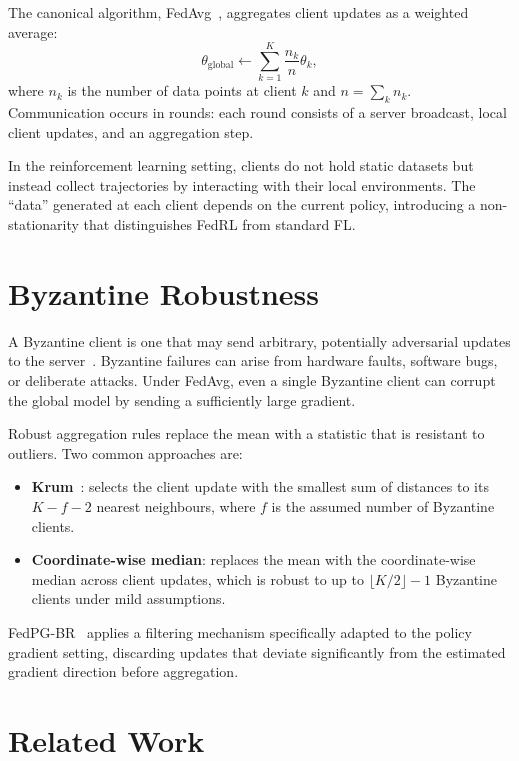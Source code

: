 \documentclass[a4paper, oneside]{discothesis}
\begin{document}
The canonical algorithm, FedAvg~\cite{FedAvg}, aggregates client updates as a weighted average:
\begin{equation}
    \theta_{\text{global}} \leftarrow \sum_{k=1}^{K} \frac{n_k}{n} \theta_k,
\end{equation}
where $n_k$ is the number of data points at client $k$ and $n = \sum_k n_k$. Communication occurs in rounds: each round consists of a server broadcast, local client updates, and an aggregation step.

In the reinforcement learning setting, clients do not hold static datasets but instead collect trajectories by interacting with their local environments. The ``data'' generated at each client depends on the current policy, introducing a non-stationarity that distinguishes FedRL from standard FL.

\section{Byzantine Robustness}
\label{sec:byzantine}

A Byzantine client is one that may send arbitrary, potentially adversarial updates to the server~\cite{ByzantineGenerals}. Byzantine failures can arise from hardware faults, software bugs, or deliberate attacks. Under FedAvg, even a single Byzantine client can corrupt the global model by sending a sufficiently large gradient.

Robust aggregation rules replace the mean with a statistic that is resistant to outliers. Two common approaches are:

\begin{itemize}
    \item \textbf{Krum}~\cite{Krum}: selects the client update with the smallest sum of distances to its $K - f - 2$ nearest neighbours, where $f$ is the assumed number of Byzantine clients.
    \item \textbf{Coordinate-wise median}: replaces the mean with the coordinate-wise median across client updates, which is robust to up to $\lfloor K/2 \rfloor - 1$ Byzantine clients under mild assumptions.
\end{itemize}

FedPG-BR~\cite{FedPGBR} applies a filtering mechanism specifically adapted to the policy gradient setting, discarding updates that deviate significantly from the estimated gradient direction before aggregation.

\section{Related Work}
\label{sec:related}
\end{document}
